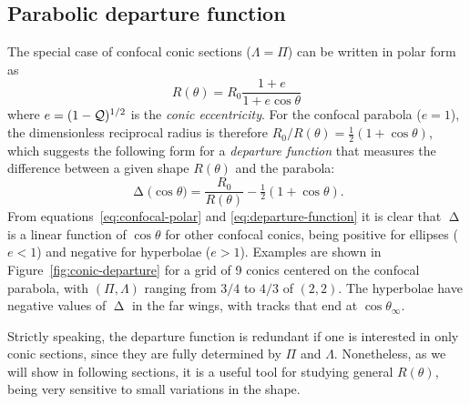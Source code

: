 \documentclass[useAMS, usenatbib, a4paper]{mnras}
\DeclareMathOperator{\Depart}{\Delta}
\newcommand\ecc{\ensuremath{e}}
\begin{document}
\subsection{Parabolic departure function}
\label{sec:parab-depart-funct}

The special case of confocal conic sections
(\(\Lambda = \Pi\)) can be written in polar form as
\begin{equation}
  \label{eq:confocal-polar}
  R(\theta) = R_0 \frac {1 + \ecc} {1 + \ecc \cos \theta}
\end{equation}
where \(\ecc = (1 - \Q)^{1/2}\) is the \textit{conic eccentricity}.
For the confocal parabola (\(\ecc = 1\)), the dimensionless reciprocal
radius is therefore \(R_0/R(\theta) = \tfrac12 (1 + \cos \theta)\), which
suggests the following form for a \textit{departure function} that
measures the difference between a given shape \(R(\theta)\) and the
parabola:
\begin{equation}
  \label{eq:departure-function}
  \Depart\bigl(\cos \theta\bigr) = \frac{R_0} {R(\theta)} - \tfrac12 \left( 1 + \cos \theta \right). 
\end{equation}
From equations~\eqref{eq:confocal-polar} and
\eqref{eq:departure-function} it is clear that \(\Depart\) is a linear
function of \(\cos \theta\) for other confocal conics, being positive for
ellipses (\(\ecc < 1\)) and negative for hyperbolae (\(\ecc > 1\)).
Examples are shown in Figure~\ref{fig:conic-departure} for a grid of 9
conics centered on the confocal parabola, with \((\Pi, \Lambda)\) ranging from
\(3/4\) to \(4/3\) of \((2, 2)\).  The hyperbolae have negative values
of \(\Depart\) in the far wings, with tracks that end at \(\cos \theta_\infty\).

Strictly speaking, the departure function is redundant if one is
interested in only conic sections, since they are fully determined by
\(\Pi\) and \(\Lambda\).  Nonetheless, as we will show in following sections,
it is a useful tool for studying general \(R(\theta)\), being very
sensitive to small variations in the shape.


\end{document}
